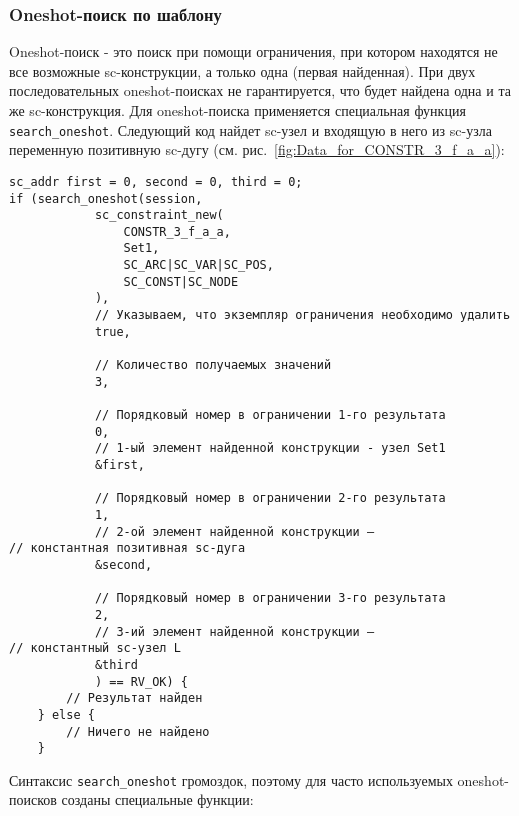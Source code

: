 \subsubsection{Oneshot-поиск по шаблону}
\label{sec:libsc_search_oneshot}

Oneshot-поиск - это поиск при помощи ограничения, при котором
находятся не все возможные sc-конструкции, а только одна (первая
найденная). При двух последовательных oneshot-поисках не
гарантируется, что будет найдена одна и та же sc-конструкция. Для
oneshot-поиска применяется специальная функция
\lstinline|search_oneshot|. Следующий код найдет sc-узел  и
входящую в него из sc-узла  переменную позитивную sc-дугу
(см. рис.~\ref{fig:Data_for_CONSTR_3_f_a_a}):
\begin{lstlisting}[texcl]
sc_addr first = 0, second = 0, third = 0; 
if (search_oneshot(session,
            sc_constraint_new(
                CONSTR_3_f_a_a,
                Set1,
                SC_ARC|SC_VAR|SC_POS,
                SC_CONST|SC_NODE
            ),
            // Указываем, что экземпляр ограничения необходимо удалить
            true,

            // Количество получаемых значений
            3,

            // Порядковый номер в ограничении 1-го результата
            0,
            // 1-ый элемент найденной конструкции - узел Set1
            &first,
            
            // Порядковый номер в ограничении 2-го результата
            1,
            // 2-ой элемент найденной конструкции –
// константная позитивная sc-дуга
            &second,

            // Порядковый номер в ограничении 3-го результата
            2,
            // 3-ий элемент найденной конструкции –
// константный sc-узел L
            &third
            ) == RV_OK) {
        // Результат найден
    } else {
        // Ничего не найдено
    }
\end{lstlisting}

Синтаксис \lstinline|search_oneshot| громоздок, поэтому для часто
используемых oneshot-поисков созданы специальные функции:

